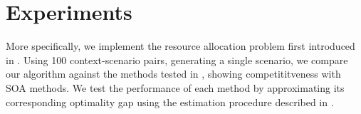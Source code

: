 \documentclass{article}
\begin{document}

\section{Experiments }
\label{sec:experiments}


More specifically, we implement the resource allocation problem first introduced in \cite{kannanTechnicalNoteDataDriven2025}. Using 100 context-scenario pairs, generating a single scenario, we compare our algorithm against the methods tested in \cite{homem-de-melloForecastingOutsideBox2024}, showing competititveness with SOA methods. We test the performance of each method by approximating its corresponding optimality gap using the estimation procedure described in \cite{MAK199947}.

\end{document}
